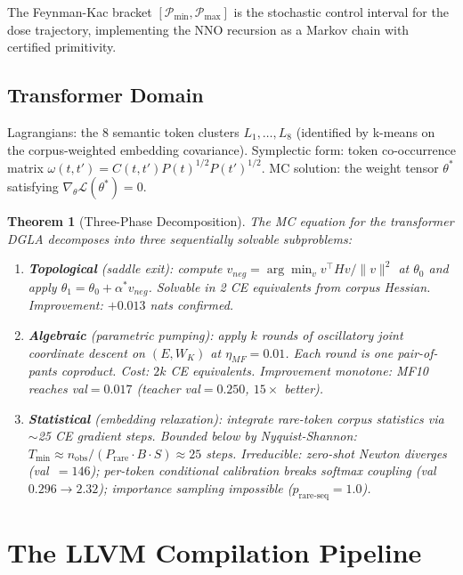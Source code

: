 \documentclass[11pt]{amsart}
\newtheorem{theorem}{Theorem}[section]
\begin{document}
The Feynman-Kac bracket $[\mathcal{P}_{\min}, \mathcal{P}_{\max}]$
is the stochastic control interval for the dose trajectory,
implementing the NNO recursion as a Markov chain with certified primitivity.

\subsection{Transformer Domain}

Lagrangians: the 8 semantic token clusters $L_1, \ldots, L_8$
(identified by k-means on the corpus-weighted embedding covariance).
Symplectic form: token co-occurrence matrix $\omega(t,t') = C(t,t') P(t)^{1/2} P(t')^{1/2}$.
MC solution: the weight tensor $\theta^*$ satisfying
$\nabla_\theta \mathcal{L}(\theta^*) = 0$.

\begin{theorem}[Three-Phase Decomposition]
\label{thm:three-phase}
The MC equation for the transformer DGLA decomposes into three
sequentially solvable subproblems:
\begin{enumerate}
\item \textbf{Topological} (saddle exit): compute
  $v_{neg} = \arg\min_v v^\top H v / \|v\|^2$ at $\theta_0$
  and apply $\theta_1 = \theta_0 + \alpha^* v_{neg}$.
  Solvable in 2 CE equivalents from corpus Hessian.
  Improvement: $+0.013$ nats confirmed.

\item \textbf{Algebraic} (parametric pumping): apply $k$ rounds of
  oscillatory joint coordinate descent on $(E, W_K)$ at
  $\eta_{MF} = 0.01$. Each round is one pair-of-pants coproduct.
  Cost: $2k$ CE equivalents. Improvement monotone: MF10 reaches
  val${=}0.017$ (teacher val${=}0.250$, $15\times$ better).

\item \textbf{Statistical} (embedding relaxation): integrate
  rare-token corpus statistics via $\sim$25 CE gradient steps.
  Bounded below by Nyquist-Shannon:
  $T_{\min} \approx n_{\text{obs}} / (P_{\text{rare}} \cdot B \cdot S)
  \approx 25$ steps.
  Irreducible: zero-shot Newton diverges (val~$=146$);
  per-token conditional calibration breaks softmax coupling
  (val $0.296 \to 2.32$); importance sampling impossible
  ($p_{\text{rare-seq}} = 1.0$).
\end{enumerate}
\end{theorem}

\section{The LLVM Compilation Pipeline}
\end{document}
